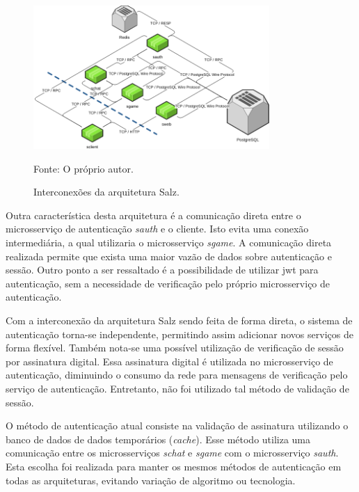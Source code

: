 \begin{figure}[htb!]
  \caption{Interconexões da arquitetura Salz.}
  \label{fig:interconexao_salz}
  \includegraphics[width=0.8\textwidth]{figuras/interconexoes/salz.png}
  \centering

  Fonte: O próprio autor.
\end{figure}



Outra característica desta arquitetura é a comunicação direta entre o microsserviço de autenticação \textit{sauth} e o cliente.
%
Isto evita uma conexão intermediária, a qual utilizaria o microsserviço \textit{sgame}.
%
A comunicação direta realizada permite que exista uma maior vazão de dados sobre autenticação e sessão.
%
Outro ponto a ser ressaltado é a possibilidade de utilizar \ac{jwt} para autenticação, sem a necessidade de verificação pelo próprio microsserviço de autenticação.



Com a interconexão da arquitetura Salz sendo feita de forma direta, o sistema de autenticação torna-se independente, permitindo assim adicionar novos serviços de forma flexível.
%
Também nota-se uma possível utilização de verificação de sessão por assinatura digital.
%
Essa assinatura digital é utilizada no microsserviço de autenticação, diminuindo o consumo da rede para mensagens de verificação pelo serviço de autenticação.
%
Entretanto, não foi utilizado tal método de validação de sessão.




O método de autenticação atual consiste na validação de assinatura utilizando o banco de dados de dados temporários (\textit{cache}).
%
Esse método utiliza uma comunicação entre os microsserviços \textit{schat} e \textit{sgame} com o microsserviço \textit{sauth}.
%
Esta escolha foi realizada para manter os mesmos métodos de autenticação em todas as arquiteturas, evitando variação de algoritmo ou tecnologia.



